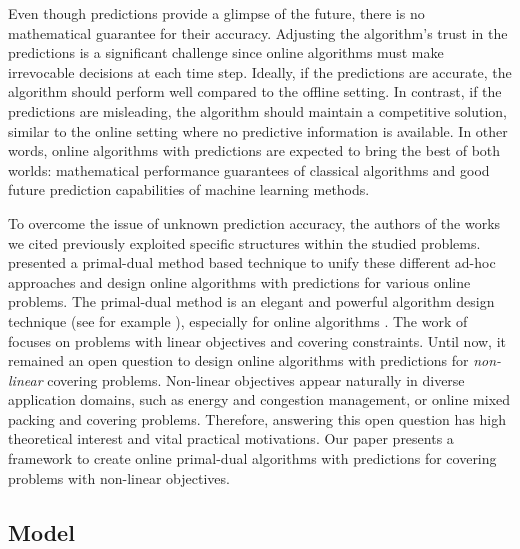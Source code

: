 Even though predictions provide a glimpse of the future, there is no mathematical guarantee for their accuracy. Adjusting the algorithm's trust in the predictions is a significant challenge since online algorithms must make irrevocable decisions at each time step. Ideally, if the predictions are accurate, the algorithm should perform well compared to the offline setting. In contrast, if the predictions are misleading, the algorithm should maintain a competitive solution, similar to the online setting where no predictive information is available. In other words, online algorithms with predictions are expected to bring the best of both worlds: mathematical performance guarantees of classical algorithms and good future prediction capabilities of machine learning methods.

To overcome the issue of unknown prediction accuracy, the authors of the works we cited previously exploited specific structures within the studied problems. \cite{BamasMaggiori20:The-Primal-Dual-method} presented a primal-dual method based technique to unify these different ad-hoc approaches and design online algorithms with predictions for various online problems. The primal-dual method is an elegant and powerful algorithm design technique (see for example \cite{WilliamsonShmoys11:The-design-of-approximation}), especially for online algorithms \citep{BuchbinderNaor09:Online-primal-dual, BuchbinderNaor09:The-Design-of-Competitive}. The work of \cite{BamasMaggiori20:The-Primal-Dual-method} focuses on problems with linear objectives and covering constraints. Until now, it remained an open question to design online algorithms with predictions for \emph{non-linear} covering problems. Non-linear objectives appear naturally in diverse application domains, such as energy and congestion management, or online mixed packing and covering problems. Therefore, answering this open question has high theoretical interest and vital practical motivations. Our paper presents a framework to create online primal-dual algorithms with predictions for covering problems with non-linear objectives.


\subsection{Model}  	\label{sec:model}

